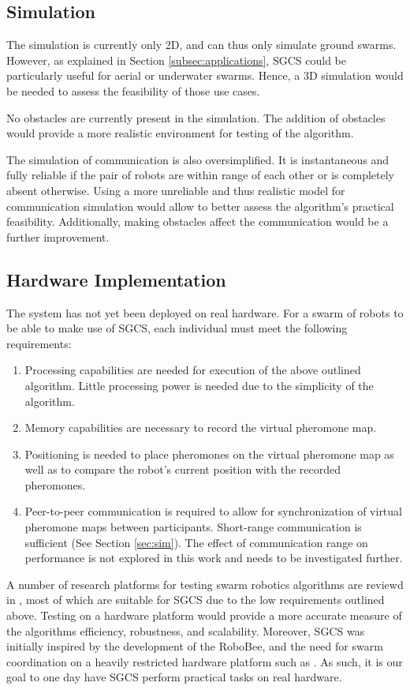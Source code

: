 \subsection{Simulation}
The simulation is currently only 2D, and can thus only simulate ground swarms. However, as explained in Section \ref{subsec:applications}, SGCS could be particularly useful for aerial or underwater swarms. Hence, a 3D simulation would be needed to assess the feasibility of those use cases.
\par No obstacles are currently present in the simulation. The addition of obstacles would provide a more realistic environment for testing of the algorithm.
\par The simulation of communication is also oversimplified. It is instantaneous and fully reliable if the pair of robots are within range of each other or is completely absent otherwise. Using a more unreliable and thus realistic model for communication simulation would allow to better assess the algorithm's practical feasibility. Additionally, making obstacles affect the communication would be a further improvement.
\subsection{Hardware Implementation}
\label{subsec:hwreq}
The system has not yet been deployed on real hardware. For a swarm of robots to be able to make use of SGCS, each individual must meet the following requirements:
\begin{enumerate}
	\item Processing capabilities are needed for execution of the above outlined algorithm. Little processing power is needed due to the simplicity of the algorithm. 
	\item Memory capabilities are necessary to record the virtual pheromone map.
	\item Positioning is needed to place pheromones on the virtual pheromone map as well as to compare the robot's current position with the recorded pheromones.
	\item Peer-to-peer communication is required to allow for synchronization of virtual pheromone maps between participants. Short-range communication is sufficient (See Section \ref{sec:sim}). The effect of communication range on performance is not explored in this work and needs to be investigated further. 
\end{enumerate}
\par A number of research platforms for testing swarm robotics algorithms are reviewd in \parencite{schranz_swarm_2020}, most of which are suitable for SGCS due to the low requirements outlined above. Testing on a hardware platform would provide a more accurate measure of the algorithms efficiency, robustness, and scalability. Moreover, SGCS was initially inspired by the development of the RoboBee, and the need for swarm coordination on a heavily restricted hardware platform such as \parencite{chen_controlled_2019}. As such, it is our goal to one day have SGCS perform practical tasks on real hardware.

